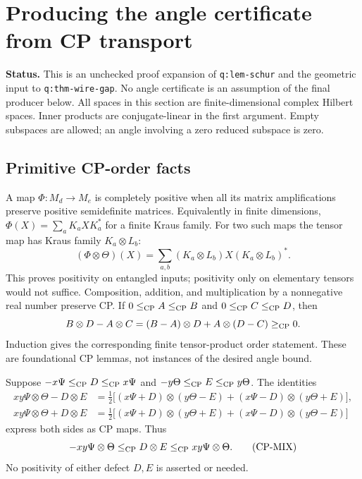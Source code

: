 \section{Producing the angle certificate from CP transport}
\label{urgent:cp}
\noindent\textbf{Status.} This is an unchecked proof expansion of
\texttt{q:lem-schur} and the geometric input to \texttt{q:thm-wire-gap}.
No angle certificate is an assumption of the final producer below.
All spaces in this section are finite-dimensional complex Hilbert spaces.
Inner products are conjugate-linear in the first argument. Empty subspaces
are allowed; an angle involving a zero reduced subspace is zero.

\subsection{Primitive CP-order facts}
A map $\Phi:M_d\to M_e$ is completely positive when all its matrix
amplifications preserve positive semidefinite matrices. Equivalently in
finite dimensions, $\Phi(X)=\sum_a K_aXK_a^*$ for a finite Kraus family.
For two such maps the tensor map has Kraus family $K_a\otimes L_b$:
\[
 (\Phi\otimes\Theta)(X)=\sum_{a,b}(K_a\otimes L_b)X(K_a\otimes L_b)^*.
\]
This proves positivity on entangled inputs; positivity only on elementary
tensors would not suffice. Composition, addition, and multiplication by a
nonnegative real number preserve CP. If $0\le_{\rm CP}A\le_{\rm CP}B$
and $0\le_{\rm CP}C\le_{\rm CP}D$, then
\[
 B\otimes D-A\otimes C=(B-A)\otimes D+A\otimes(D-C)\ge_{\rm CP}0.
\]
Induction gives the corresponding finite tensor-product order statement.
These are foundational CP lemmas, not instances of the desired angle bound.

Suppose $-x\Psi\le_{\rm CP}D\le_{\rm CP}x\Psi$ and
$-y\Theta\le_{\rm CP}E\le_{\rm CP}y\Theta$. The identities
\begin{align*}
xy\Psi\otimes\Theta-D\otimes E
 &=\tfrac12\big[(x\Psi+D)\otimes(y\Theta-E)
                 +(x\Psi-D)\otimes(y\Theta+E)\big],\\
xy\Psi\otimes\Theta+D\otimes E
 &=\tfrac12\big[(x\Psi+D)\otimes(y\Theta+E)
                 +(x\Psi-D)\otimes(y\Theta-E)\big]
\end{align*}
express both sides as CP maps. Thus
\[
 -xy\Psi\otimes\Theta\le_{\rm CP}D\otimes E
                         \le_{\rm CP}xy\Psi\otimes\Theta.
\tag{CP-MIX}
\]
No positivity of either defect $D,E$ is asserted or needed.

